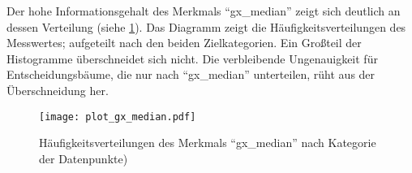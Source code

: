 Der hohe Informationsgehalt des Merkmals \enquote{gx\_median} zeigt sich deutlich an dessen Verteilung (siehe \cref{fig:histogramm_gx_median}). Das Diagramm zeigt die Häufigkeitsverteilungen des Messwertes; aufgeteilt nach den beiden Zielkategorien. Ein Großteil der Histogramme überschneidet sich nicht. Die verbleibende Ungenauigkeit für Entscheidungsbäume, die nur nach \enquote{gx\_median} unterteilen, rüht aus der Überschneidung her. 

\begin{figure}[ht]
	\centering
	\texttt{[image: plot\_gx\_median.pdf]}
	\caption{Häufigkeitsverteilungen des Merkmals \enquote{gx\_median} nach Kategorie der Datenpunkte)}
	\label{fig:histogramm_gx_median}
\end{figure}
